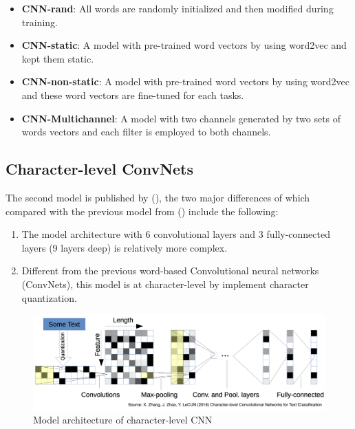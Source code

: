 \documentclass[]{krantz}
\providecommand{\tightlist}{%
  \setlength{\itemsep}{0pt}\setlength{\parskip}{0pt}}
\begin{document}
\begin{itemize}
\tightlist
\item
  \textbf{CNN-rand}: All words are randomly initialized and then modified during training.
\item
  \textbf{CNN-static}: A model with pre-trained word vectors by using word2vec and kept them static.
\item
  \textbf{CNN-non-static}: A model with pre-trained word vectors by using word2vec and these word vectors are fine-tuned for each tasks.
\item
  \textbf{CNN-Multichannel}: A model with two channels generated by two sets of words vectors and each filter is employed to both channels.
\end{itemize}

\hypertarget{character-level-convnets}{%
\subsection{Character-level ConvNets}\label{character-level-convnets}}

The second model is published by (\citet{Zhang2015CharacterlevelCN}), the two major differences of which compared with the previous model from (\citet{Kim2014ConvolutionalNN}) include the following:

\begin{enumerate}
\def\labelenumi{\arabic{enumi}.}
\tightlist
\item
  The model architecture with 6 convolutional layers and 3 fully-connected layers (9 layers deep) is relatively more complex.
\item
  Different from the previous word-based Convolutional neural networks (ConvNets), this model is at character-level by implement character quantization.
\end{enumerate}

\begin{figure}[ht]

{\centering \includegraphics[width=0.7\linewidth]{figures/01-03-cnns-and-their-applications-in-nlp/Character_level_CNN} 

}

\caption{\label{fig:fig_8} Model architecture of character-level CNN}\label{fig:figs-8}
\end{figure}
\end{document}
